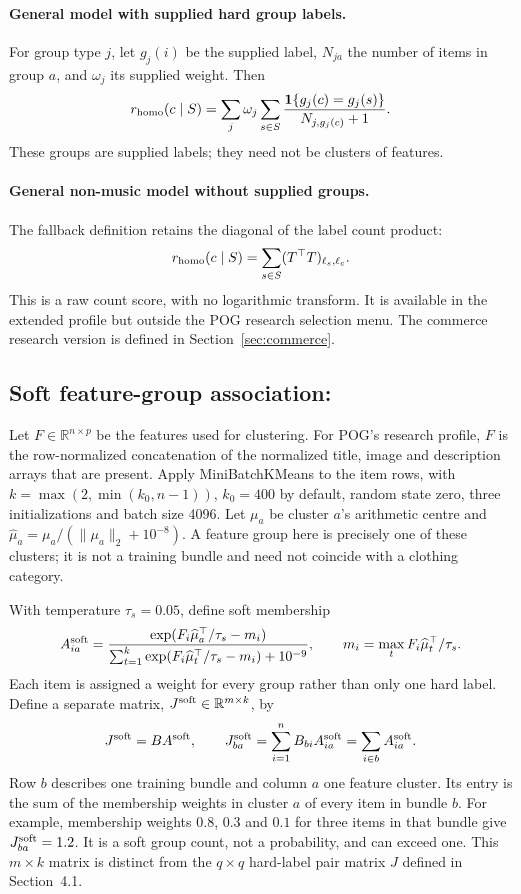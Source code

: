 \documentclass[11pt,a4paper]{article}
\DeclareRobustCommand{\key}[1]{\texttt{\detokenize{#1}}}
\newcommand{\ind}{\mathbf 1}
\begin{document}
\paragraph{General model with supplied hard group labels.}
For group type $j$, let $g_j(i)$ be the supplied label, $N_{ja}$ the number of
items in group $a$, and $\omega_j$ its supplied weight. Then
\[
 r_{\rm homo}(c\mid S)=\sum_j\omega_j\sum_{s\in S}
 \frac{\ind\{g_j(c)=g_j(s)\}}{N_{j,g_j(c)}+1}.
\]
These groups are supplied labels; they need not be clusters of features.

\paragraph{General non-music model without supplied groups.}
The fallback definition retains the diagonal of the label count product:
\[
 r_{\rm homo}(c\mid S)=\sum_{s\in S}(T^\top T)_{\ell_s,\ell_c}.
\]
This is a raw count score, with no logarithmic transform. It is available in
the extended profile but outside the POG research selection menu.
The commerce research version is defined in Section~\ref{sec:commerce}.

\subsection{Soft feature-group association: \key{softcat}}
Let $F\in\mathbb R^{n\times p}$ be the features used for clustering.
For POG's research profile, $F$ is the row-normalized concatenation of the
normalized title, image and description arrays that are present. Apply
MiniBatchKMeans to the item rows, with
$k=\max(2,\min(k_0,n-1))$, $k_0=400$ by default, random state zero,
three initializations and batch size 4096. Let $\mu_a$ be cluster $a$'s
arithmetic centre and $\widehat\mu_a=\mu_a/(\|\mu_a\|_2+10^{-8})$.
A feature group here is precisely one of these clusters; it is not a
training bundle and need not coincide with a clothing category.

With temperature $\tau_s=0.05$, define soft membership
\begin{equation}
 A^{\rm soft}_{ia}=
 \frac{\exp(F_i\widehat\mu_a^\top/\tau_s-m_i)}
 {\sum_{t=1}^k\exp(F_i\widehat\mu_t^\top/\tau_s-m_i)+10^{-9}},\qquad
 m_i=\max_t F_i\widehat\mu_t^\top/\tau_s.
\end{equation}
Each item is assigned a weight for every group rather than only one hard label.
Define a separate matrix, $J^{\rm soft}\in\mathbb R^{m\times k}$, by
\[
 J^{\rm soft}=BA^{\rm soft},\qquad
 J^{\rm soft}_{ba}=\sum_{i=1}^nB_{bi}A^{\rm soft}_{ia}
                  =\sum_{i\in b}A^{\rm soft}_{ia}.
\]
Row $b$ describes one training bundle and column $a$ one feature cluster.
Its entry is the sum of the membership weights in cluster $a$ of every item
in bundle $b$. For example, membership weights $0.8$, $0.3$ and $0.1$ for
three items in that bundle give $J^{\rm soft}_{ba}=1.2$.
It is a soft group count, not a probability, and can exceed one.
This $m\times k$ matrix is distinct from the $q\times q$ hard-label pair
matrix $J$ defined in Section~4.1.
\end{document}
